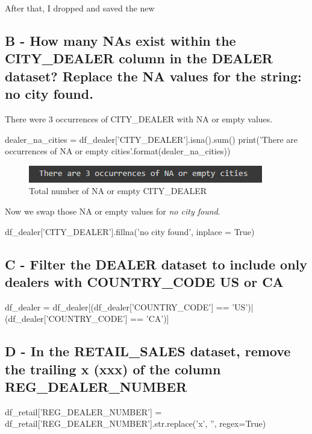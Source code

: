 \documentclass[a4paper, 12pt]{article}
\begin{document}
After that, I dropped and saved the new 

\subsection{B - How many NAs exist within the CITY\_DEALER column in the DEALER dataset? Replace the NA values for the string:  no city found.}

There were 3 occurrences of CITY\_DEALER with NA or empty values.

\begin{python}
	dealer_na_cities = df_dealer['CITY_DEALER'].isna().sum()
	print('There are {} occurrences of NA or empty cities'.format(dealer_na_cities))
\end{python}

\begin{figure}[!htb]
	\caption{\label{img_5} Total number of NA or empty CITY\_DEALER}
	\begin{center}
		\includegraphics[scale=1.1]{img_05.PNG}
	\end{center}
\end{figure}

Now we swap those NA or empty values for \textit{no city found}.

\begin{python}
	df_dealer['CITY_DEALER'].fillna('no city found', inplace = True)
\end{python}

\subsection{C - Filter the DEALER dataset to include only dealers with COUNTRY\_CODE US or CA}

\begin{python}
	df_dealer = df_dealer[(df_dealer['COUNTRY_CODE'] == 'US')|(df_dealer['COUNTRY_CODE'] == 'CA')]
\end{python}

\subsection{D - In the RETAIL\_SALES dataset, remove the trailing x (xxx) of the column REG\_DEALER\_NUMBER}

\begin{python}
	df_retail['REG_DEALER_NUMBER'] = df_retail['REG_DEALER_NUMBER'].str.replace('x', '', regex=True)
\end{python}
\end{document}
